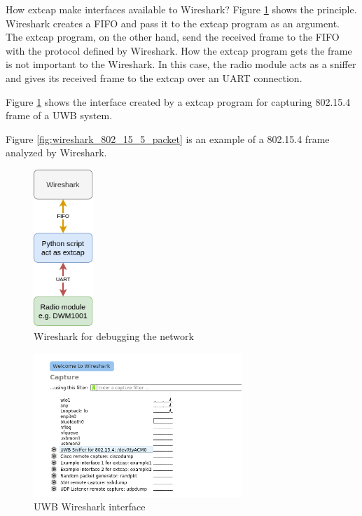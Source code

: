 \documentclass[\main/main.tex]{subfiles}
\begin{document}
How extcap make interfaces available to Wireshark? Figure \ref{fig:extcap_802_15_4} shows the principle. Wireshark creates a FIFO and pass it to the extcap program as an argument. The extcap program, on the other hand, send the received frame to the FIFO with the protocol defined by Wireshark. How the extcap program gets the frame is not important to the Wireshark. In this case, the radio module acts as a sniffer and gives its received frame to the extcap over an UART connection.

Figure \ref{fig:extcap_802_15_4} shows the interface created by a extcap program for capturing 802.15.4 frame of a UWB system.

Figure \ref{fig:wireshark_802_15_5_packet} is an example of a 802.15.4 frame analyzed by Wireshark.

\begin{figure}[H]
    \begin{center}
        \includegraphics[width=0.2\textwidth]{extcap_802_15_4.png}
    \end{center}
    \caption{Wireshark for debugging the network}
    \label{fig:extcap_802_15_4}
\end{figure}

\begin{figure}[H]
    \begin{center}
        \includegraphics[width=0.7\textwidth]{wireshark_interface.png}
    \end{center}
    \caption{UWB Wireshark interface}
    \label{fig:wireshark_interface}
\end{figure}
\end{document}
